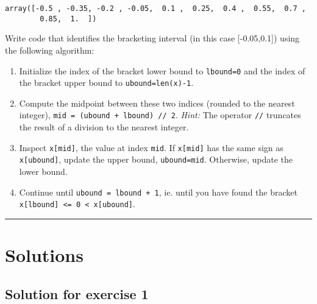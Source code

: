\documentclass[10pt]{scrartcl}
\makeatletter
\providecommand{\tightlist}{%
      \setlength{\itemsep}{0pt}\setlength{\parskip}{0pt}}
\newcommand{\boxspacing}{\kern\kvtcb@left@rule\kern\kvtcb@boxsep}
\newcommand{\prompt}[4]{
        {\ttfamily\llap{{\color{#2}[#3]:\hspace{3pt}#4}}\vspace{-\baselineskip}}
    }
\makeatother
\begin{document}
            \begin{tcolorbox}[breakable, size=fbox, boxrule=.5pt, pad at break*=1mm, opacityfill=0]
\prompt{Out}{outcolor}{23}{\boxspacing}
\begin{Verbatim}[commandchars=\\\{\}]
array([-0.5 , -0.35, -0.2 , -0.05,  0.1 ,  0.25,  0.4 ,  0.55,  0.7 ,
        0.85,  1.  ])
\end{Verbatim}
\end{tcolorbox}
        
    Write code that identifies the bracketing interval (in this case
{[}-0.05,0.1{]}) using the following algorithm:

\begin{enumerate}
\def\labelenumi{\arabic{enumi}.}
\tightlist
\item
  Initialize the index of the bracket lower bound to \texttt{lbound=0}
  and the index of the bracket upper bound to \texttt{ubound=len(x)-1}.
\item
  Compute the midpoint between these two indices (rounded to the nearest
  integer), \texttt{mid\ =\ (ubound\ +\ lbound)\ //\ 2}. \emph{Hint:}
  The operator \texttt{//} truncates the result of a division to the
  nearest integer.
\item
  Inspect \texttt{x{[}mid{]}}, the value at index \texttt{mid}. If
  \texttt{x{[}mid{]}} has the same sign as \texttt{x{[}ubound{]}},
  update the upper bound, \texttt{ubound=mid}. Otherwise, update the
  lower bound.
\item
  Continue until \texttt{ubound\ =\ lbound\ +\ 1}, ie. until you have
  found the bracket
  \texttt{x{[}lbound{]}\ \textless{}=\ 0\ \textless{}\ x{[}ubound{]}}.
\end{enumerate}

    \begin{center}\rule{0.5\linewidth}{0.5pt}\end{center}

\hypertarget{solutions}{%
\section{Solutions}\label{solutions}}

\hypertarget{solution-for-exercise-1}{%
\subsection{Solution for exercise 1}\label{solution-for-exercise-1}}
\end{document}
